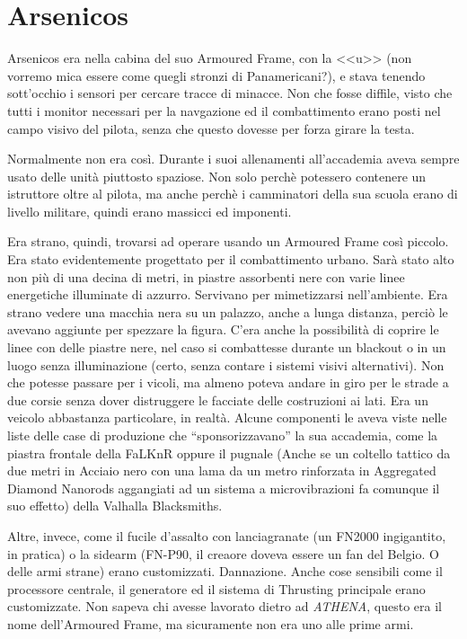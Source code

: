   \section*{Arsenicos}

    Arsenicos era nella cabina del suo Armoured Frame, con la <<u>> (non vorremo mica essere come quegli stronzi di
    Panamericani?), e stava tenendo sott'occhio i sensori per cercare tracce di minacce. Non che fosse diffile, visto
    che tutti i monitor necessari per la navgazione ed il combattimento erano posti nel campo visivo del pilota, senza
    che questo dovesse per forza girare la testa.

    Normalmente non era così. Durante i suoi allenamenti all'accademia aveva sempre usato delle unità piuttosto
    spaziose. Non solo perchè potessero contenere un istruttore oltre al pilota, ma anche perchè i camminatori della sua scuola erano di
    livello militare, quindi erano massicci ed imponenti.

    Era strano, quindi, trovarsi ad operare usando un Armoured Frame così piccolo. Era stato evidentemente progettato
    per il combattimento urbano. Sarà stato alto non più di una decina di metri, in piastre assorbenti nere con varie linee
    energetiche illuminate di azzurro. Servivano per mimetizzarsi nell'ambiente. Era strano vedere una macchia nera su
    un palazzo, anche a lunga distanza, perciò le avevano aggiunte per spezzare la figura. C'era anche la possibilità di
    coprire le linee con delle piastre nere, nel caso si combattesse durante un blackout o in un luogo senza
    illuminazione (certo, senza contare i sistemi visivi alternativi). Non che potesse passare per i vicoli, ma almeno poteva andare in giro per le strade a
    due corsie senza dover distruggere le facciate delle costruzioni ai lati. Era un veicolo abbastanza particolare, in
    realtà. Alcune componenti le aveva viste nelle liste delle case di produzione che ``sponsorizzavano'' la sua
    accademia, come la piastra frontale della FaLKnR oppure il pugnale (Anche se un coltello tattico da due metri in
    Acciaio nero con una lama da un metro rinforzata in Aggregated Diamond Nanorods aggangiati ad un sistema a
    microvibrazioni fa comunque il suo effetto) della Valhalla Blacksmiths.

    Altre, invece, come il fucile d'assalto con lanciagranate (un FN2000 ingigantito, in pratica) o la sidearm (FN-P90,
    il creaore doveva essere un fan del Belgio. O delle armi strane) erano customizzati. Dannazione. Anche cose
    sensibili come il processore centrale, il generatore ed il sistema di Thrusting principale erano customizzate. Non
    sapeva chi avesse lavorato dietro ad \emph{ATHENA}, questo era il nome dell'Armoured Frame, ma sicuramente non era
    uno alle prime armi.

